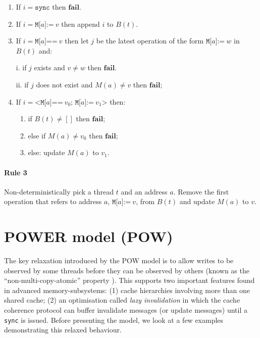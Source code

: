 \documentclass[11pt]{article}
\begin{document}
\begin{enumerate}
\item 
     If $i = \texttt{sync}$ then $\textbf{fail}$.

\item 
     If $i = \texttt{M[}a\texttt{]:=}~v$ then append $i$ to $B(t)$.

\item 
     If $i = \texttt{M[}a\texttt{]==}~v$ then let $j$ be the latest
     operation of the form $\texttt{M[}a\texttt{]:=}~w$ in
     $B(t)$ and:
     
       i.   if $j$ exists and $v \neq w$ then $\textbf{fail}$.

       ii.  if $j$ does not exist and $M(a) \neq v$ then $\textbf{fail}$;

\item
     If $i = \texttt{<M[}a\texttt{]==}~v_0\texttt{; M[}a\texttt{]:=}~v_1
     \texttt{>}$ then:

\begin{enumerate}[i]
\item
           if $B(t) \neq []$ then $\textbf{fail}$;

\item
           else if $M(a) \neq v_0$ then $\textbf{fail}$;

\item
           else: update $M(a)$ to $v_1$.
\end{enumerate}
\end{enumerate}

\paragraph{Rule 3}

Non-deterministically pick a thread $t$ and an address $a$.  Remove
the first operation that refers to address $a$,
$\texttt{M[}a\texttt{]:=}~v$, from $B(t)$ and update $M(a)$ to $v$.

\section{POWER model (POW)}
\label{Section:POWERModel}

The key relaxation introduced by the POW model is to allow writes to
be observed by some threads before they can be observed by others
(known as the ``non-multi-copy-atomic'' property \cite{POWER}).  This
supports two important features found in advanced memory-subsystems:
(1) cache hierarchies involving more than one shared cache; (2) an
optimisation called \emph{lazy invalidation} in which the cache
coherence protocol can buffer invalidate messages (or update
messages) until a \verb!sync! is issued.  Before presenting the model,
we look at a few examples demonstrating this relaxed behaviour.
\end{document}
